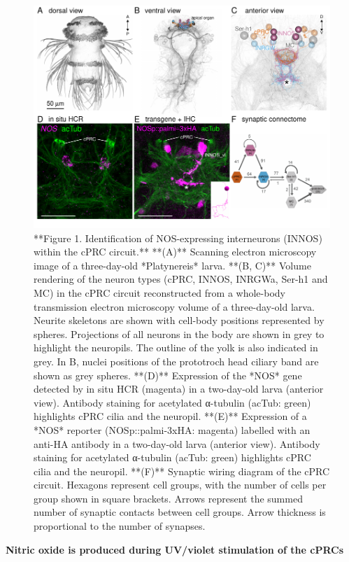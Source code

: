 \documentclass[
  10pt,
  onecolumn]{article}
\begin{document}
\begin{figure}
\includegraphics[width=25in]{figures/Fig1} \caption{**Figure 1. Identification of NOS-expressing interneurons (INNOS) within the cPRC circuit.** **(A)** Scanning electron microscopy image of a three-day-old *Platynereis* larva. **(B, C)** Volume rendering of the neuron types (cPRC, INNOS, INRGWa, Ser-h1 and MC) in the cPRC circuit reconstructed from a whole-body transmission electron microscopy volume of a three-day-old larva. Neurite skeletons are shown with cell-body positions represented by spheres. Projections of all neurons in the body are shown in grey to highlight the neuropils. The outline of the yolk is also indicated in grey. In B, nuclei positions of the prototroch head ciliary band are shown as grey spheres. **(D)** Expression of the *NOS* gene detected by in situ HCR (magenta) in a two-day-old larva (anterior view). Antibody staining for acetylated α-tubulin (acTub: green) highlights cPRC cilia and the neuropil. **(E)** Expression of a *NOS* reporter (NOSp::palmi-3xHA: magenta) labelled with an anti-HA antibody in a two-day-old larva (anterior view). Antibody staining for acetylated α-tubulin (acTub: green) highlights cPRC cilia and the neuropil. **(F)** Synaptic wiring diagram of the cPRC circuit. Hexagons represent cell groups, with the number of cells per group shown in square brackets. Arrows represent the summed number of synaptic contacts between cell groups. Arrow thickness is proportional to the number of synapses.}\label{fig:unnamed-chunk-1}
\end{figure}

\textbf{Nitric oxide is produced during UV/violet stimulation of the
cPRCs}
\end{document}
